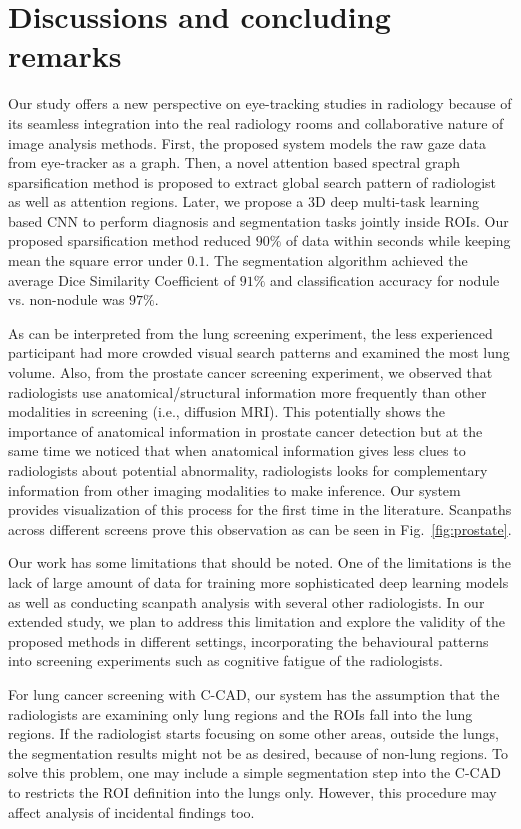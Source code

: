 \documentclass[preprint,12pt]{elsarticle}
\begin{document}
\section{Discussions and concluding remarks}
Our study offers a new perspective on eye-tracking studies in radiology because of its seamless integration into the real radiology rooms and collaborative nature of image analysis methods. First, the proposed system models the raw gaze data from eye-tracker as a graph. Then, a novel attention based spectral graph sparsification method is proposed to extract global search pattern of radiologist as well as attention regions. Later, we propose a 3D deep multi-task learning based CNN to perform diagnosis and segmentation tasks jointly inside ROIs. Our proposed sparsification method reduced $90\%$ of data within seconds while keeping mean the square error under $0.1$. The segmentation algorithm achieved the average Dice Similarity Coefficient of $91\%$ and classification accuracy for nodule vs. non-nodule was $97\%$.

As can be interpreted from the lung screening experiment, the less experienced participant had more crowded visual search patterns and examined the most lung volume. Also, from the prostate cancer screening experiment, we observed that radiologists use anatomical/structural information more frequently than other modalities in screening (i.e., diffusion MRI). This potentially shows the importance of anatomical information in prostate cancer detection but at the same time we noticed that when anatomical information gives less clues to radiologists about potential abnormality, radiologists looks for complementary information from other imaging modalities to make inference. Our system provides visualization of this process for the first time in the literature. Scanpaths across different screens prove this observation as can be seen in Fig.~\ref{fig:prostate}.

Our work has some limitations that should be noted. One of the limitations  is the lack of large amount of data for training more sophisticated deep learning models as well as conducting scanpath analysis with several other radiologists. In our extended study, we plan to address this limitation and explore the validity of the proposed methods in different settings, incorporating the behavioural patterns into screening experiments such as cognitive fatigue of the radiologists.

For lung cancer screening with C-CAD, our system has the assumption that the radiologists are examining only lung regions and the ROIs fall into the lung regions. If the radiologist starts focusing on some other areas, outside the lungs, the segmentation results might not be as desired, because of non-lung regions. To solve this problem, one may include a simple segmentation step into the C-CAD to restricts the ROI definition into the lungs only. However, this procedure may affect analysis of incidental findings too.
\end{document}
